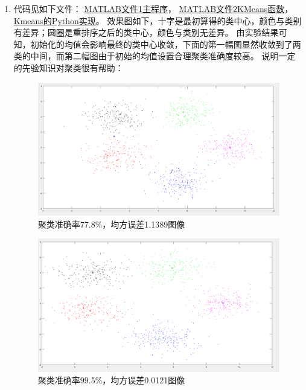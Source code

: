 \documentclass[a4paper,11pt,onecolumn,oneside,UTF8]{article}
\begin{document}
\begin{enumerate}
      \item

            代码见如下文件：
            \href{https://github.com/Allenem/PatternRecognition/blob/main/hw5/PR_hw5_1.m}{MATLAB文件1主程序}，
            \href{https://github.com/Allenem/PatternRecognition/blob/main/hw5/K_Means.m}{MATLAB文件2KMeans函数}，
            \href{https://github.com/Allenem/PatternRecognition/blob/main/hw5/hw_5_kmeans.py}{Kmeans的Python实现}。
            效果图如下，十字是最初算得的类中心，颜色与类别有差异；圆圈是重排序之后的类中心，颜色与类别无差异。
            由实验结果可知，初始化的均值会影响最终的类中心收敛，下面的第一幅图显然收敛到了两类的中间，而第二幅图由于初始的均值设置合理聚类准确度较高。
            说明一定的先验知识对聚类很有帮助：\\
            \begin{figure}[H]
                  \centering
                  \includegraphics[width=.8\textwidth]{hw5_2.png}
                  \caption{ 聚类准确率77.8\%，均方误差1.1389图像 }
                  \label{img2}
            \end{figure}
            \begin{figure}[H]
                  \centering
                  \includegraphics[width=.8\textwidth]{hw5_3.png}
                  \caption{ 聚类准确率99.5\%，均方误差0.0121图像 }
                  \label{img3}
            \end{figure}


\end{enumerate}
\end{document}
